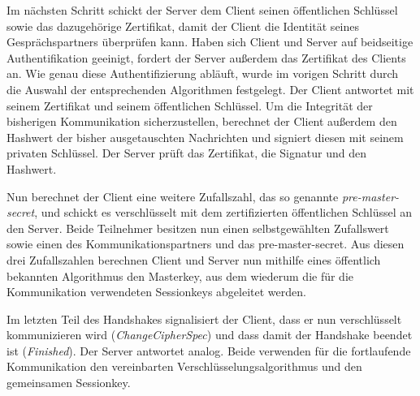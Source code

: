 Im nächsten Schritt schickt der Server dem Client seinen öffentlichen Schlüssel sowie das dazugehörige Zertifikat, damit der Client die Identität seines
Gesprächspartners überprüfen kann. Haben sich Client und Server auf beidseitige Authentifikation geeinigt, fordert der Server außerdem das Zertifikat des
Clients an.
Wie genau diese Authentifizierung abläuft, wurde im vorigen Schritt durch die Auswahl der entsprechenden Algorithmen festgelegt. Der Client antwortet mit
seinem Zertifikat und seinem öffentlichen Schlüssel. Um die Integrität der bisherigen Kommunikation sicherzustellen, berechnet der Client außerdem den Hashwert
der bisher ausgetauschten Nachrichten und signiert diesen mit seinem privaten Schlüssel. Der Server prüft das Zertifikat, die Signatur und den Hashwert.

Nun berechnet der Client eine weitere Zufallszahl, das so genannte \emph{pre-master-secret}, und schickt es verschlüsselt mit dem
zertifizierten öffentlichen Schlüssel an den Server. Beide Teilnehmer besitzen nun einen selbstgewählten Zufallswert sowie einen des
Kommunikationspartners und das pre-master-secret. Aus diesen drei Zufallszahlen berechnen Client und Server nun mithilfe eines öffentlich bekannten
Algorithmus den Masterkey, aus dem wiederum die für die Kommunikation verwendeten Sessionkeys abgeleitet werden.

Im letzten Teil des Handshakes signalisiert der Client, dass er nun verschlüsselt kommunizieren wird (\emph{ChangeCipherSpec}) und dass damit der
Handshake beendet ist (\emph{Finished}). Der Server antwortet analog. Beide verwenden für die fortlaufende Kommunikation den vereinbarten
Verschlüsselungsalgorithmus und den gemeinsamen Sessionkey.

